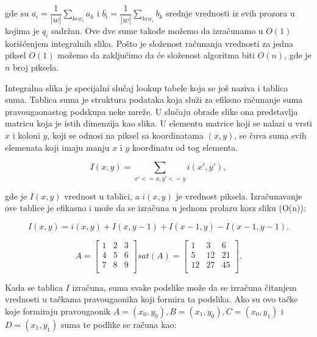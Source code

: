 \documentclass[a4paper,12pt,titlepage]{article}
\begin{document}
gde su $\overline{a_i} = \dfrac{1}{|w|}\sum_{k \epsilon w_i} a_k$ i $\overline{b_i} = \dfrac{1}{|w|}\sum_{k \epsilon w_i} b_k$ srednje vrednosti iz svih prozora u kojima je $q_i$ sadržan. Ove dve sume takođe možemo da izračunamo u $O(1)$ korišćenjem  integralnih slika. Pošto je složenost računanja vrednosti za jedna piksel $O(1)$ možemo da zaključimo da  će složenost algoritma biti $O(n)$, gde je $n$ broj piksela.

Integralna slika je specijalni slučaj lookup tabele koja se još naziva i tablica suma. Tablica suma je struktura podataka koja služi za efiksno računanje suma pravougaonastog podskupa neke mreže. U slučaju obrade slike ona predstavlja matricu koja je istih dimenzija kao slika. U elementu matrice koji se nalazi u vrsti $x$ i koloni $y$, koji se odnosi na piksel sa koordinatama $(x, y)$, se čuva suma svih elemenata koji imaju manju $x$ i $y$ koordinatu od tog elementa. 

\begin{equation}\label{eq:gf17}
I(x, y) = \sum_{x' <= x, y' <= y} i(x', y'),
\end{equation}

gde je $I(x, y)$ vrednost u tablici, a $i(x, y)$ je vrednost piksela. Izračunavanje ove tablice je efikasno i može da se izračuna u jednom prolazu korz sliku (O(n)):

\begin{equation}\label{eq:gf18}
I(x, y) = i(x, y) + I(x, y - 1) + I(x - 1, y) - I(x - 1, y - 1).
\end{equation}

\begin{equation}\label{eq:gf18}
 A
 =
\begin{bmatrix}
     1 & 2 & 3 \\
     4 & 5 & 6 \\
     7 & 8 & 9 \\
\end{bmatrix}
sat(A)
=
\begin{bmatrix}
     1 & 3 & 6 \\
     5 & 12 & 21 \\
     12 & 27 & 45 \\
\end{bmatrix}
.\end{equation}

Kada se tablica $I$  izračuna, suma svake podslike može da se izračuna čitanjem vrednosti u tačkama pravougaonika koji formira ta podslika. Ako su ovo tačke koje formiraju pravougaonik $A = (x_0, y_0), B = (x_1, y_0), C = (x_0, y_1)$ i $D = (x_1, y_1)$ suma te podlike se računa kao:
\end{document}
